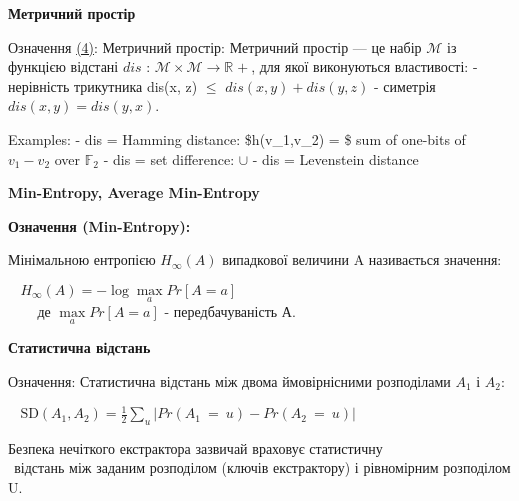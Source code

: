 \documentclass[11pt]{article}
\begin{document}
\vspace{5ex}
    \hypertarget{ux43cux435ux442ux440ux438ux447ux43dux438ux439-ux43fux440ux43eux441ux442ux456ux440}{%
\textbf{Метричний
простір}\label{ux43cux435ux442ux440ux438ux447ux43dux438ux439-ux43fux440ux43eux441ux442ux456ux440}}

Означення \hyperref[література]{(4)}: Метричний простір: Метричний
простір --- це набір \(\mathcal{M}\) із функцією відстані
\(\textit{dis}\) :
$\mathcal{M}\times\mathcal{M}\longrightarrow \mathbb{R}^{}+ $, для
якої виконуються властивості: - нерівність трикутника dis(x, z) $\leq$
\(\textit{dis}(x, y) + \textit{dis}(y, z)\) - симетрія
\(\textit{dis}(x, y) = \textit{dis}(y, x)\).

Examples: - dis = Hamming distance: \$h(v\_1,v\_2) = \$ sum of one-bits
of \(v_1-v_2\) over \(\mathbb{F}_2\) - dis = set difference: \(\cup\) -
dis = Levenstein distance
\vspace{15ex}

\hypertarget{min-entropy-average-min-entropy-statistical-distance}{%
\textbf{Min-Entropy, Average Min-Entropy}\label{min-entropy-average-min-entropy-statistical-distance}}

\vspace{2ex}

\bf{Означення (Min-Entropy):}
\normalfont

Мінімальною ентропією \(H_\infty(A)\) випадкової величини A називається
значення:

\(~~~~H_\infty(A) = -\log{\underset{a}{\max}}{Pr[A = a]}\)\\
\(~~~~~~~~\) де \(\underset{a}{\max}{Pr[A = a]}\) - передбачуваність А.

\vspace{6ex}

    \hypertarget{ux441ux442ux430ux442ux438ux441ux442ux438ux447ux43dux430-ux432ux456ux434ux441ux442ux430ux43dux44c}{%
\textbf{Статистична
відстань}\label{ux441ux442ux430ux442ux438ux441ux442ux438ux447ux43dux430-ux432ux456ux434ux441ux442ux430ux43dux44c}}

Означення: Статистична відстань між двома ймовірнісними розподілами
\(A_1\) і \(A_2\):

\(~~~~\text{SD}(A_1,A_2) = \frac{1}{2}\sum\limits_{u}|Pr(A_1~=~u)-Pr(A_2~=~u)|\)

Безпека нечіткого екстрактора зазвичай враховує статистичну\\
\(~~\)відстань між заданим розподілом (ключів екстрактору) і рівномірним
розподілом U.

\vspace{3ex}
\end{document}
